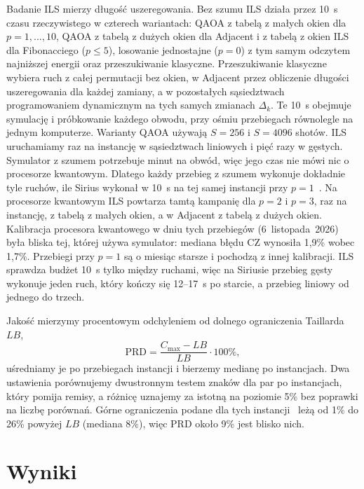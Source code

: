 \documentclass[runningheads]{llncs}
\begin{document}
Badanie ILS mierzy długość uszeregowania. Bez szumu ILS działa przez 10~s
czasu rzeczywistego w czterech wariantach: QAOA z tabelą z małych okien dla
$p = 1, \dots, 10$, QAOA z tabelą z dużych okien dla Adjacent i z tabelą
z okien ILS dla Fibonacciego ($p \le 5$), losowanie jednostajne ($p = 0$)
z tym samym odczytem najniższej energii oraz przeszukiwanie klasyczne.
Przeszukiwanie klasyczne wybiera ruch z całej permutacji bez okien,
w Adjacent przez obliczenie długości uszeregowania dla każdej zamiany,
a w pozostałych sąsiedztwach programowaniem dynamicznym na tych samych
zmianach $\Delta_k$. Te 10~s obejmuje symulację i próbkowanie każdego obwodu,
przy ośmiu przebiegach równolegle na jednym komputerze. Warianty QAOA
używają $S = 256$ i $S = 4096$ shotów. ILS uruchamiamy raz na instancję
w sąsiedztwach liniowych i pięć razy w gęstych. Symulator z szumem
potrzebuje minut na obwód, więc jego czas nie mówi nic o procesorze kwantowym. Dlatego
każdy przebieg z szumem wykonuje dokładnie tyle ruchów, ile Sirius wykonał
w 10~s na tej samej instancji przy $p = 1$~\cite{wojewodzki2026aciids}. Na
procesorze kwantowym ILS powtarza tamtą kampanię dla $p = 2$ i $p = 3$, raz na
instancję, z tabelą z małych okien, a w Adjacent z tabelą z dużych okien.
Kalibracja procesora kwantowego w dniu tych przebiegów (6~listopada~2026) była bliska
tej, której używa symulator: mediana błędu CZ wynosiła 1{,}9\% wobec 1{,}7\%.
Przebiegi przy $p = 1$ są o miesiąc starsze i pochodzą z innej kalibracji.
ILS sprawdza budżet 10~s tylko między ruchami, więc na Siriusie przebieg
gęsty wykonuje jeden ruch, który kończy się 12--17~s po starcie, a przebieg
liniowy od jednego do trzech.

Jakość mierzymy procentowym odchyleniem od dolnego ograniczenia Taillarda
$LB$,
\begin{equation}
  \mathrm{PRD} = \frac{C_{\max} - LB}{LB} \cdot 100\% ,
\end{equation}
uśredniamy je po przebiegach
instancji i bierzemy medianę po instancjach. Dwa ustawienia porównujemy
dwustronnym testem znaków dla par po instancjach, który pomija remisy,
a różnicę uznajemy za istotną na poziomie 5\% bez poprawki na liczbę porównań.
Górne ograniczenia podane dla tych instancji~\cite{taillard1993} leżą od 1\% do
26\% powyżej $LB$ (mediana 8\%), więc PRD około 9\% jest blisko nich.

\section{Wyniki}
\end{document}
